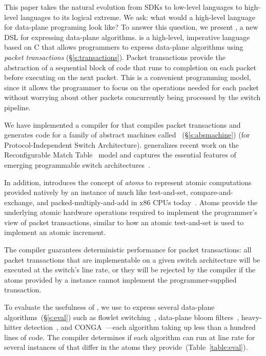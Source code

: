 This paper takes the natural evolution from SDKs to low-level languages to high-level
languages to its logical extreme. We ask: what would a high-level language for
data-plane programing look like? To answer this question, we present
\pktlanguage, a new DSL for expressing data-plane algorithms. \pktlanguage is a
high-level, imperative language based on C that allows programmers to express
data-plane algorithms using {\em packet transactions} (\S\ref{s:transactions}).
Packet transactions provide the abstraction of a sequential block of code that
runs to completion on each packet before executing on the next packet. This is
a convenient programming model, since it allows the programmer to focus on the
operations needed for each packet without worrying about other packets
concurrently being processed by the switch pipeline.

We have implemented a compiler for \pktlanguage that compiles \pktlanguage
packet transactions and generates code for a family of abstract machines called
\absmachine~(\S\ref{s:absmachine}) (for Protocol-Independent Switch
Architecture). \absmachine generalizes recent work on the Reconfigurable Match
Table~\cite{rmt} model and captures the essential features of emerging
programmable switch architectures~\cite{rmt, xpliant, flexpipe}.

In addition, \absmachine introduces the concept of {\em atoms} to represent
atomic computations provided natively by an instance of \absmachine much like
test-and-set, compare-and-exchange, and packed-multiply-and-add in x86 CPUs
today~\cite{x86_manual}.  Atoms provide the underlying atomic hardware
operations required to implement the programmer's view of packet transactions,
similar to how an atomic test-and-set is used to implement an atomic increment.

The \pktlanguage compiler guarantees deterministic performance for packet
transactions: all packet transactions that are implementable on a given switch
architecture will be executed at the switch's line rate, or they will be
rejected by the compiler if the atoms provided by a \absmachine instance cannot
implement the programmer-supplied transaction.

To evaluate the usefulness of \pktlanguage, we use \pktlanguage to express
several data-plane algorithms~(\S\ref{s:eval}) such as flowlet
switching~\cite{flowlets}, data-plane bloom filters~\cite{bloom}, heavy-hitter
detection~\cite{opensketch}, and CONGA~\cite{conga}---each algorithm taking
up less than a hundred lines of \pktlanguage code.  The \pktlanguage compiler
determines if each algorithm can run at line rate for several instances of
\absmachine that differ in the atoms they provide~(Table~\ref{table:eval}).
